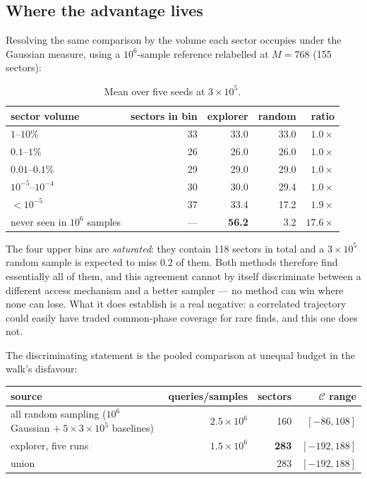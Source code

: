 \documentclass[11pt]{article}
\newcommand{\good}[1]{\textcolor{blue!70!black}{\textbf{#1}}}
\begin{document}
\subsection{Where the advantage lives}

Resolving the same comparison by the volume each sector occupies under the
Gaussian measure, using a $10^6$-sample reference relabelled at $M=768$
(155 sectors):

\begin{table}[h]\centering\small
\begin{tabular}{lrrrr}
\toprule
sector volume & sectors in bin & explorer & random & ratio \\
\midrule
$1$--$10\%$                  & 33 & 33.0 & 33.0 & $1.0\times$ \\
$0.1$--$1\%$                 & 26 & 26.0 & 26.0 & $1.0\times$ \\
$0.01$--$0.1\%$              & 29 & 29.0 & 29.0 & $1.0\times$ \\
$10^{-5}$--$10^{-4}$         & 30 & 30.0 & 29.4 & $1.0\times$ \\
$<10^{-5}$                   & 37 & 33.4 & 17.2 & $1.9\times$ \\
never seen in $10^{6}$ samples & --- & \good{56.2} & 3.2 & \good{$17.6\times$} \\
\bottomrule
\end{tabular}
\caption{Mean over five seeds at $3\times10^5$.}
\end{table}

The four upper bins are \emph{saturated}: they contain 118 sectors in total and
a $3\times10^5$ random sample is expected to miss $0.2$ of them. Both methods
therefore find essentially all of them, and this agreement cannot by itself
discriminate between a different access mechanism and a better sampler --- no
method can win where none can lose. What it does establish is a real negative:
a correlated trajectory could easily have traded common-phase coverage for rare
finds, and this one does not.

The discriminating statement is the pooled comparison at unequal budget in the
walk's disfavour:

\begin{table}[h]\centering\small
\begin{tabular}{lrrr}
\toprule
source & queries/samples & sectors & $\mathcal{C}$ range \\
\midrule
all random sampling ($10^6$ Gaussian $+\ 5\times3\times10^5$ baselines)
   & $2.5\times10^6$ & 160 & $[-86,108]$ \\
explorer, five runs & $1.5\times10^6$ & \good{283} & \good{$[-192,188]$} \\
union & & 283 & $[-192,188]$ \\
\bottomrule
\end{tabular}
\end{table}
\end{document}
